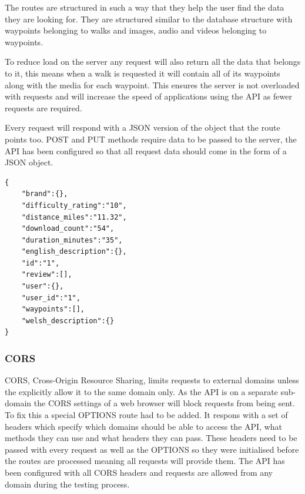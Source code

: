 \documentclass[11pt,a4paper]{article}
\begin{document}
The routes are structured in such a way that they help the user find the data they are looking for. They are structured similar to the database structure with waypoints belonging to walks and images, audio and videos belonging to waypoints.

To reduce load on the server any request will also return all the data that belongs to it, this means when a walk is requested it will contain all of its waypoints along with the media for each waypoint. This ensures the server is not overloaded with requests and will increase the speed of applications using the API as fewer requests are required.

Every request will respond with a JSON version of the object that the route points too. POST and PUT methods require data to be passed to the server, the API has been configured so that all request data should come in the form of a JSON object.


\begin{lstlisting}[captionpos=b, caption=JSON Return data from /walks/1, label=lst:model, frame=single]
{
	"brand":{},
	"difficulty_rating":"10",
	"distance_miles":"11.32",
	"download_count":"54",
	"duration_minutes":"35",
	"english_description":{},
	"id":"1",
	"review":[],
	"user":{},
	"user_id":"1",
	"waypoints":[],
	"welsh_description":{}
}
\end{lstlisting}

\subsubsection{CORS}
CORS, Cross-Origin Resource Sharing, limits requests to external domains unless the explicitly allow it to the same domain only. As the API is on a separate sub-domain the CORS settings of a web browser will block requests from being sent. To fix this a special OPTIONS route had to be added. It respons with a set of headers which specify which domains should be able to access the API, what methods they can use and what headers they can pass. These headers need to be passed with every request as well as the OPTIONS so they were initialised before the routes are processed meaning all requests will provide them. The API has been configured with all CORS headers and requests are allowed from any domain during the testing process.
\end{document}
